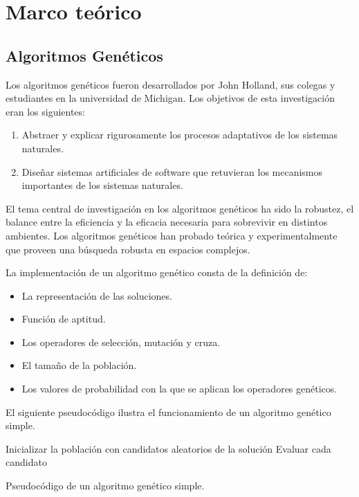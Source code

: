 \chapter{Marco teórico}


\section{Algoritmos Genéticos}

Los algoritmos genéticos fueron desarrollados por John Holland, sus colegas y estudiantes en la universidad de Michigan. Los objetivos de esta investigación eran los siguientes:
\begin{enumerate}
	\item Abstraer y explicar rigurosamente los procesos adaptativos de los sistemas naturales.
	\item Diseñar sistemas artificiales de software que retuvieran los mecanismos importantes de los sistemas naturales.
\end{enumerate}

El tema central de investigación en los algoritmos genéticos ha sido la robustez, el balance entre la eficiencia y la eficacia necesaria para sobrevivir en distintos ambientes. Los algoritmos genéticos han probado teórica y experimentalmente que proveen una búsqueda robusta en espacios complejos.

La implementación de un algoritmo genético consta de la definición de:

\begin{itemize}
	\item La representación de las soluciones.
	\item Función de aptitud.
	\item Los operadores de selección, mutación y cruza.
	\item El tamaño de la población.
	\item Los valores de probabilidad con la que se aplican los operadores genéticos.
\end{itemize}

El siguiente pseudocódigo ilustra el funcionamiento de un algoritmo genético simple.

\begin{algorithm}[h] 
	
	\SetAlgoLined
	Inicializar la población con candidatos aleatorios de la solución\;
	Evaluar cada candidato\;
	
	\caption{Pseudocódigo de un algoritmo genético simple.}
\end{algorithm}

